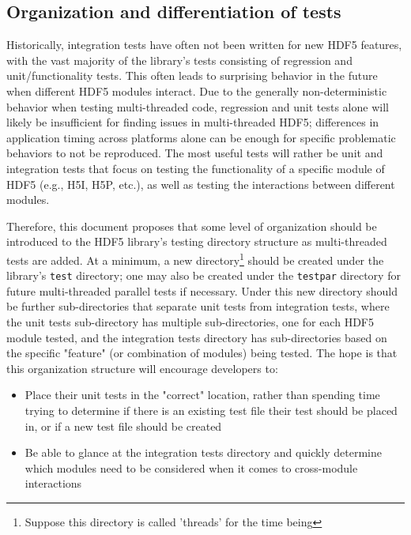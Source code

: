 \documentclass[../HDF5_RFC.tex]{subfiles}
\begin{document}
\subsection{Organization and differentiation of tests}

Historically, integration tests have often not been written for new HDF5 features, with the vast majority
of the library's tests consisting of regression and unit/functionality tests. This often leads to surprising behavior in the future when different HDF5 modules interact. Due to the generally non-deterministic behavior when testing multi-threaded code, regression and unit tests alone will likely be insufficient for finding issues in multi-threaded HDF5; differences in application timing across platforms alone can be enough for specific problematic behaviors to not be reproduced. The most useful tests will rather be unit and
integration tests that focus on testing the functionality of a specific module of HDF5 (e.g., H5I, H5P,
etc.), as well as testing the interactions between different modules.

Therefore, this document proposes that some level of organization should be introduced to the HDF5 library's
testing directory structure as multi-threaded tests are added. At a minimum, a new directory\footnote{Suppose this directory is called 'threads' for the time being} should be created under the library's \texttt{test} directory; one may also be created under the \texttt{testpar} directory for future multi-threaded parallel tests if necessary. Under this new directory should be further sub-directories that separate unit tests
from integration tests, where the unit tests sub-directory has multiple sub-directories, one for each HDF5 module tested, and the integration tests directory has sub-directories based on the specific "feature" (or combination of modules) being tested. The hope is that this organization structure will encourage developers to:

\begin{itemize}

    \item Place their unit tests in the "correct" location, rather than spending time trying to determine if
          there is an existing test file their test should be placed in, or if a new test file should be
          created
    \item Be able to glance at the integration tests directory and quickly determine which modules need to
          be considered when it comes to cross-module interactions

\end{itemize}
\end{document}
